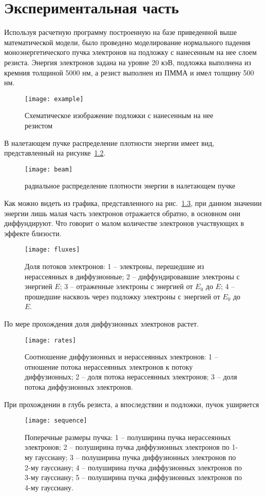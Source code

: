 \chapter{Экспериментальная часть}
Используя расчетную программу построенную на базе приведенной выше математической модели, было проведено моделирование нормального падения моноэнергетического пучка электронов на подложку с нанесенным на нее слоем резиста. Энергия электронов задана на уровне 20 кэВ, подложка выполнена из кремния толщиной 5000 нм, а резист выполнен из ПММА и имел толщину 500 нм.

\begin{figure}[h]
    \center
    \texttt{[image: example]}
    \caption{Схематическое изображение подложки с нанесенным на нее резистом}
    \label{fig:example}
\end{figure}
В налетающем пучке распределение плотности энергии имеет вид, представленный на рисунке~\ref{fig:beam}.
\begin{figure}[h]
    \center
    \texttt{[image: beam]}
    \caption{радиальное распределение плотности энергии в налетающем пучке}
    \label{fig:beam}
\end{figure}

Как можно видеть из графика, представленного на рис.~\ref{fig:fluxes}, при данном значении энергии лишь малая часть электронов отражается обратно, в основном они диффундируют. Что говорит о малом количестве электронов участвующих в эффекте близости.
\begin{figure}[h]
    \center
    \texttt{[image: fluxes]}
    \caption{Доля потоков электронов:
    1 -- электроны, перешедшие из нерассеянных в диффузионные;
2 -- диффундировавшие электроны с энергией $E$;
3 -- отраженные электроны с энергией от $E_0$ до $E$;
4 -- прошедшие насквозь через подложку электроны с энергией от $E_0$ до $E$.
}
    \label{fig:fluxes}
\end{figure}

По мере прохождения доля диффузионных электронов растет.
\begin{figure}[h]
    \center
    \texttt{[image: rates]}
    \caption{Соотношение диффузионных и нерассеянных электронов: 1 -- отношение потока нерассеянных электронов к потоку диффузионных;
2 -- доля потока нерассеянных электронов;
3 -- доля потока диффузионных электронов.
}
    \label{fig:rates}
\end{figure}
При прохождении в глубь резиста, а впоследствии и подложки, пучок уширяется
\begin{figure}[h]
    \center
    \texttt{[image: sequence]}
    \caption{Поперечные размеры пучка:
1 -- полуширина пучка нерассеянных электронов;
2 -- полуширина пучка диффузионных электронов по 1-му гауссиану;
3 -- полуширина пучка диффузионных электронов по 2-му гауссиану;
4 -- полуширина пучка диффузионных электронов по 3-му гауссиану;
5 -- полуширина пучка диффузионных электронов по 4-му гауссиану.}
    \label{fig:sequence}
\end{figure}

